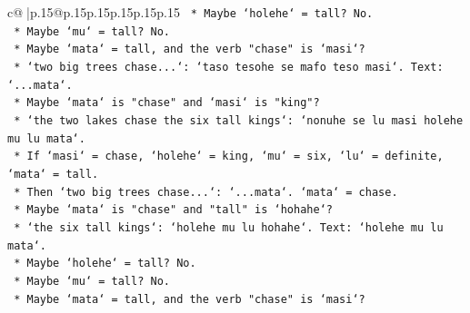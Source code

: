 \documentclass{article}
\begin{document}
{\begin{supertabular}{c@{$\;$}|p{.15\linewidth}@{}p{.15\linewidth}p{.15\linewidth}p{.15\linewidth}p{.15\linewidth}p{.15\linewidth}}
{{{\texttt{                                                                                                    *   Maybe `holehe` = tall? No.} \\
\texttt{                                                                                                    *   Maybe `mu` = tall? No.} \\
\texttt{                                                                                                    *   Maybe `mata` = tall, and the verb "chase" is `masi`?} \\
\texttt{                                                                                                        *   `two big trees chase...`: `taso tesohe se mafo teso masi`. Text: `...mata`.} \\
\texttt{                                                                                                        *   Maybe `mata` is "chase" and `masi` is "king"?} \\
\texttt{                                                                                                            *   `the two lakes chase the six tall kings`: `nonuhe se lu masi holehe mu lu mata`.} \\
\texttt{                                                                                                            *   If `masi` = chase, `holehe` = king, `mu` = six, `lu` = definite, `mata` = tall.} \\
\texttt{                                                                                                            *   Then `two big trees chase...`: `...mata`. `mata` = chase.} \\
\texttt{                                                                                                            *   Maybe `mata` is "chase" and "tall" is `hohahe`?} \\
\texttt{                                                                                                                *   `the six tall kings`: `holehe mu lu hohahe`. Text: `holehe mu lu mata`.} \\
\texttt{                                                                                                                *   Maybe `holehe` = tall? No.} \\
\texttt{                                                                                                                *   Maybe `mu` = tall? No.} \\
\texttt{                                                                                                                *   Maybe `mata` = tall, and the verb "chase" is `masi`?} \\
}}}
\end{supertabular}}
\end{document}
